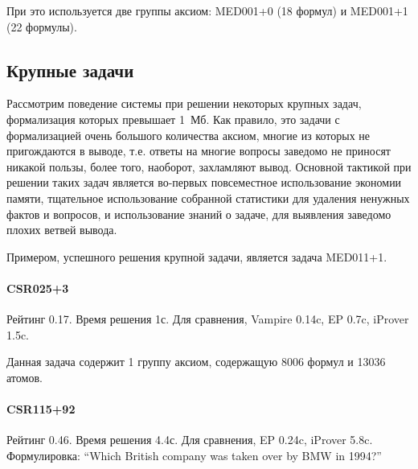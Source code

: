 При это используется две группы аксиом: MED001+0 (18 формул) и MED001+1 (22 формулы).







\subsection{Крупные задачи}
Рассмотрим поведение системы при решении некоторых крупных задач, формализация которых превышает 1~Мб. Как правило, это задачи с формализацией очень большого количества аксиом, многие из которых не пригождаются в выводе, т.е. ответы на многие вопросы заведомо не приносят никакой пользы, более того, наоборот, захламляют вывод. Основной тактикой при решении таких задач является во-первых повсеместное использование экономии памяти, тщательное использование собранной статистики для удаления ненужных фактов и вопросов, и использование знаний о задаче, для выявления заведомо плохих ветвей вывода.

Примером, успешного решения крупной задачи, является задача MED011+1.

\paragraph{CSR025+3}
Рейтинг 0.17. Время решения 1с. Для сравнения, Vampire 0.14c, EP 0.7c, iProver 1.5c.

Данная задача содержит 1 группу аксиом, содержащую 8006 формул и 13036 атомов.

\paragraph{CSR115+92}
Рейтинг 0.46. Время решения 4.4с. Для сравнения, EP 0.24c, iProver 5.8c.
Формулировка: ``Which British company was taken over by BMW in 1994?''

